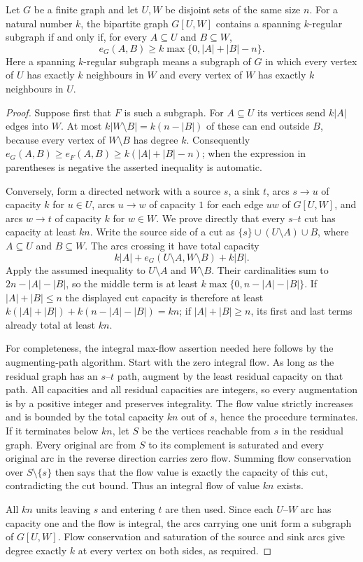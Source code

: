 \begin{lemma}
Let $G$ be a finite graph and let $U,W$ be disjoint sets of the same size $n$.
For a natural number $k$, the bipartite graph $G[U,W]$ contains a spanning
$k$-regular subgraph if and only if, for every $A\subseteq U$ and
$B\subseteq W$,
\[
 e_G(A,B)\geq k\max\{0,|A|+|B|-n\}.
\]
Here a spanning $k$-regular subgraph means a subgraph of $G$ in which every
vertex of $U$ has exactly $k$ neighbours in $W$ and every vertex of $W$ has
exactly $k$ neighbours in $U$.
\end{lemma}
\begin{proof}
Suppose first that $F$ is such a subgraph.  For $A\subseteq U$ its vertices
send $k|A|$ edges into $W$.  At most $k|W\setminus B|=k(n-|B|)$ of these
can end outside $B$, because every vertex of $W\setminus B$ has degree $k$.
Consequently
$e_G(A,B)\geq e_F(A,B)\geq k(|A|+|B|-n)$; when the expression in
parentheses is negative the asserted inequality is automatic.

Conversely, form a directed network with a source $s$, a sink $t$, arcs
$s\to u$ of capacity $k$ for $u\in U$, arcs $u\to w$ of capacity $1$ for
each edge $uw$ of $G[U,W]$, and arcs $w\to t$ of capacity $k$ for
$w\in W$.  We prove directly that every $s$--$t$ cut has capacity at least
$kn$.  Write the source side of a cut as
$\{s\}\cup (U\setminus A)\cup B$, where $A\subseteq U$ and $B\subseteq W$.
The arcs crossing it have total capacity
\[
 k|A|+e_G(U\setminus A,W\setminus B)+k|B|.
\]
Apply the assumed inequality to $U\setminus A$ and $W\setminus B$.
Their cardinalities sum to $2n-|A|-|B|$, so the middle term is at least
$k\max\{0,n-|A|-|B|\}$.  If $|A|+|B|\leq n$ the displayed cut capacity is
therefore at least $k(|A|+|B|)+k(n-|A|-|B|)=kn$; if
$|A|+|B|\geq n$, its first and last terms already total at least $kn$.

For completeness, the integral max-flow assertion needed here follows by
the augmenting-path algorithm.  Start with the zero integral flow.  As long
as the residual graph has an $s$--$t$ path, augment by the least residual
capacity on that path.  All capacities and all residual capacities are
integers, so every augmentation is by a positive integer and preserves
integrality.  The flow value strictly increases and is bounded by the total
capacity $kn$ out of $s$, hence the procedure terminates.  If it terminates
below $kn$, let $S$ be the vertices reachable from $s$ in the residual
graph.  Every original arc from $S$ to its complement is saturated and
every original arc in the reverse direction carries zero flow.  Summing
flow conservation over $S\setminus\{s\}$ then says that the flow value is
exactly the capacity of this cut, contradicting the cut bound.  Thus an
integral flow of value $kn$ exists.

All $kn$ units leaving $s$ and entering $t$ are then used.  Since each
$U$--$W$ arc has capacity one and the flow is integral, the arcs carrying
one unit form a subgraph of $G[U,W]$.  Flow conservation and saturation of
the source and sink arcs give degree exactly $k$ at every vertex on both
sides, as required.
\end{proof}
